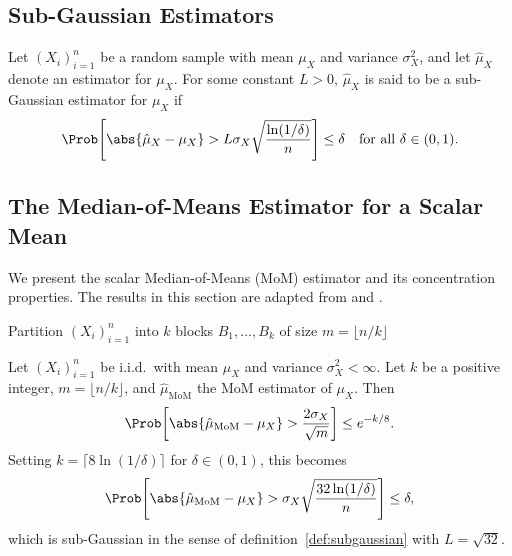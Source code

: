 \subsection{Sub-Gaussian Estimators}
\begin{definition}
\label{def:subgaussian}
Let $(X_i)_{i=1}^{n}$ be a random sample with mean $\mu_X$ and variance $\sigma_X^2$, and let $\hat{\mu}_X$ denote an estimator for $\mu_X$. For some constant $L > 0$, $\hat{\mu}_X$ is said to be a sub-Gaussian estimator for $\mu_X$ if 
\begin{equation}
\label{eq:subgaussian}
    \Prob\!\left[\abs{\hat{\mu}_X - \mu_X} > L\sigma_X \sqrt{\frac{\ln(1/\delta)}{n}}\right] \leq \delta \quad \text{for all } \delta \in (0,1).
\end{equation}
\end{definition}


\subsection{The Median-of-Means Estimator for a Scalar Mean}
\label{sec:mom_prelim}
We present the scalar Median-of-Means (MoM) estimator and its concentration properties. The results in this section are adapted from \cite{devroye2016sub} and \cite{lugosi2019mean}.

\begin{algorithm}[H]
\label{alg:mom}
\caption{Scalar Median-of-Means Estimator}

Partition $(X_i)_{i=1}^{n}$ into $k$ blocks $B_1, \dots, B_k$ of size $m = \lfloor n/k \rfloor$\;


\;
\end{algorithm}

\begin{theorem}
\label{thm:mom_scalar}
Let $(X_i)_{i=1}^{n}$ be i.i.d.\ with mean $\mu_X$ and variance $\sigma_X^2 < \infty$. Let $k$ be a positive integer, $m = \lfloor n/k \rfloor$, and $\hat{\mu}_{\mathrm{MoM}}$ the MoM estimator of $\mu_X$. Then
\begin{equation}
\label{eq:mom_conc}
    \Prob\!\left[\abs{\hat{\mu}_{\mathrm{MoM}} - \mu_X} > \frac{2\sigma_X}{\sqrt{m}}\right] \leq e^{-k/8}.
\end{equation}
Setting $k = \lceil 8\ln(1/\delta) \rceil$ for $\delta \in (0,1)$, this becomes
\begin{equation}
\label{eq:mom_subgauss}
    \Prob\!\left[\abs{\hat{\mu}_{\mathrm{MoM}} - \mu_X} > \sigma_X\sqrt{\frac{32\ln(1/\delta)}{n}}\right] \leq \delta,
\end{equation}
which is sub-Gaussian in the sense of definition~\ref{def:subgaussian} with $L=\sqrt{32}$.
\end{theorem}

